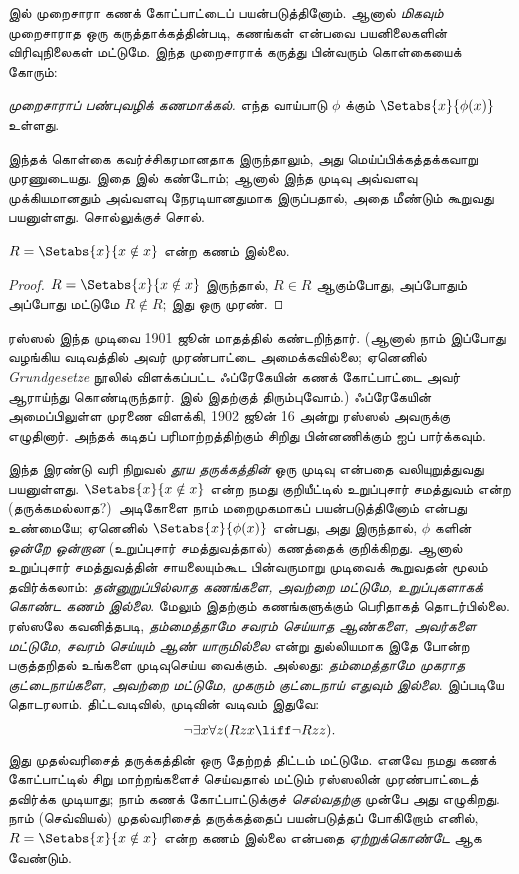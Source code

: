 \documentclass[../../../include/open-logic-section]{subfiles}
\begin{document}

 இல் முறைசாரா கணக் கோட்பாட்டைப் பயன்படுத்தினோம்.
ஆனால் \emph{மிகவும்} முறைசாராத ஒரு கருத்தாக்கத்தின்படி, கணங்கள் என்பவை
பயனிலைகளின் விரிவுநிலைகள் மட்டுமே. இந்த முறைசாராக் கருத்து பின்வரும்
கொள்கையைக் கோரும்:

\begin{defish}
  \emph{முறைசாராப் பண்புவழிக் கணமாக்கல்.} எந்த வாய்பாடு $\phi$ க்கும்
  $\Setabs{x}{\phi(x)}$ உள்ளது.
\end{defish}

இந்தக் கொள்கை கவர்ச்சிகரமானதாக இருந்தாலும், அது மெய்ப்பிக்கத்தக்கவாறு
முரணுடையது. இதை  இல் கண்டோம்; ஆனால் இந்த
முடிவு அவ்வளவு முக்கியமானதும் அவ்வளவு நேரடியானதுமாக இருப்பதால், அதை
மீண்டும் கூறுவது பயனுள்ளது. சொல்லுக்குச் சொல்.

\begin{thm}[ரஸ்ஸலின் முரண்பாடு]
$R = \Setabs{x}{x \notin x}$ என்ற கணம் இல்லை.
\end{thm}

\begin{proof}
$R = \Setabs{x}{x \notin x}$ இருந்தால்,
$R \in R$ ஆகும்போது, அப்போதும் அப்போது மட்டுமே $R \notin R$; இது ஒரு
முரண்.
\end{proof}

ரஸ்ஸல் இந்த முடிவை 1901 ஜூன் மாதத்தில் கண்டறிந்தார். (ஆனால் நாம் இப்போது
வழங்கிய வடிவத்தில் அவர் முரண்பாட்டை அமைக்கவில்லை; ஏனெனில்
\emph{Grundgesetze} நூலில் விளக்கப்பட்ட ஃப்ரேகேயின் கணக் கோட்பாட்டை அவர்
ஆராய்ந்து கொண்டிருந்தார்.  இல் இதற்குத் திரும்புவோம்.)
ஃப்ரேகேயின் அமைப்பிலுள்ள முரணை விளக்கி, 1902 ஜூன் 16 அன்று ரஸ்ஸல்
அவருக்கு எழுதினார். அந்தக் கடிதப் பரிமாற்றத்திற்கும் சிறிது பின்னணிக்கும்
\citet[pp.~124--8]{Heijenoort1967} ஐப் பார்க்கவும்.

இந்த இரண்டு வரி நிறுவல் \emph{தூய தருக்கத்தின்} ஒரு முடிவு என்பதை
வலியுறுத்துவது பயனுள்ளது. $\Setabs{x}{x \notin x}$ என்ற நமது
குறியீட்டில் உறுப்புசார் சமத்துவம் என்ற (தருக்கமல்லாத?)\ அடிகோளை நாம்
மறைமுகமாகப் பயன்படுத்தினோம் என்பது உண்மையே; ஏனெனில்
$\Setabs{x}{\phi(x)}$ என்பது, அது இருந்தால், $\phi$ களின்
\emph{ஒன்றே ஒன்றான} (உறுப்புசார் சமத்துவத்தால்) கணத்தைக் குறிக்கிறது.
ஆனால் உறுப்புசார் சமத்துவத்தின் சாயலையும்கூட பின்வருமாறு முடிவைக்
கூறுவதன் மூலம் தவிர்க்கலாம்: \emph{தன்னுறுப்பில்லாத கணங்களை, அவற்றை
மட்டுமே, உறுப்புகளாகக் கொண்ட கணம் இல்லை}. மேலும் இதற்கும் கணங்களுக்கும்
பெரிதாகத் தொடர்பில்லை. ரஸ்ஸலே கவனித்தபடி, \emph{தம்மைத்தாமே சவரம்
செய்யாத ஆண்களை, அவர்களை மட்டுமே, சவரம் செய்யும் ஆண் யாருமில்லை} என்று
துல்லியமாக இதே போன்ற பகுத்தறிதல் உங்களை முடிவுசெய்ய வைக்கும். அல்லது:
\emph{தம்மைத்தாமே முகராத குட்டைநாய்களை, அவற்றை மட்டுமே, முகரும்
குட்டைநாய் எதுவும் இல்லை}.
இப்படியே தொடரலாம். திட்டவடிவில், முடிவின் வடிவம் இதுவே:
\[
\lnot \exists x \forall z(Rzx \liff \lnot R zz).
\]
இது முதல்வரிசைத் தருக்கத்தின் ஒரு தேற்றத் திட்டம் மட்டுமே. எனவே நமது
கணக் கோட்பாட்டில் சிறு மாற்றங்களைச் செய்வதால் மட்டும் ரஸ்ஸலின்
முரண்பாட்டைத் தவிர்க்க முடியாது; நாம் கணக் கோட்பாட்டுக்குச்
\emph{செல்வதற்கு} முன்பே அது எழுகிறது. நாம் (செவ்வியல்) முதல்வரிசைத்
தருக்கத்தைப் பயன்படுத்தப் போகிறோம் எனில், $R = \Setabs{x}{x\notin x}$
என்ற கணம் இல்லை என்பதை \emph{ஏற்றுக்கொண்டே} ஆக வேண்டும்.
\end{document}
